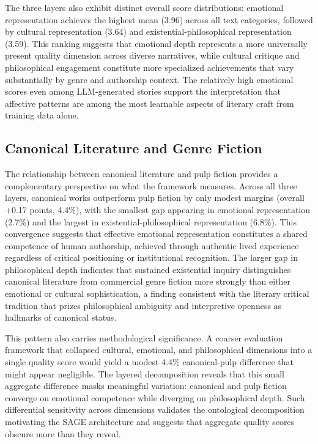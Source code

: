 The three layers also exhibit distinct overall score distributions: emotional representation achieves the highest mean (3.96) across all text categories, followed by cultural representation (3.64) and existential-philosophical representation (3.59). This ranking suggests that emotional depth represents a more universally present quality dimension across diverse narratives, while cultural critique and philosophical engagement constitute more specialized achievements that vary substantially by genre and authorship context. The relatively high emotional scores even among LLM-generated stories support the interpretation that affective patterns are among the most learnable aspects of literary craft from training data alone.

\subsection{Canonical Literature and Genre Fiction}

The relationship between canonical literature and pulp fiction provides a complementary perspective on what the framework measures. Across all three layers, canonical works outperform pulp fiction by only modest margins (overall +0.17 points, 4.4\%), with the smallest gap appearing in emotional representation (2.7\%) and the largest in existential-philosophical representation (6.8\%). This convergence suggests that effective emotional representation constitutes a shared competence of human authorship, achieved through authentic lived experience regardless of critical positioning or institutional recognition. The larger gap in philosophical depth indicates that sustained existential inquiry distinguishes canonical literature from commercial genre fiction more strongly than either emotional or cultural sophistication, a finding consistent with the literary critical tradition that prizes philosophical ambiguity and interpretive openness as hallmarks of canonical status.

This pattern also carries methodological significance. A coarser evaluation framework that collapsed cultural, emotional, and philosophical dimensions into a single quality score would yield a modest 4.4\% canonical-pulp difference that might appear negligible. The layered decomposition reveals that this small aggregate difference masks meaningful variation: canonical and pulp fiction converge on emotional competence while diverging on philosophical depth. Such differential sensitivity across dimensions validates the ontological decomposition motivating the SAGE architecture and suggests that aggregate quality scores obscure more than they reveal.


